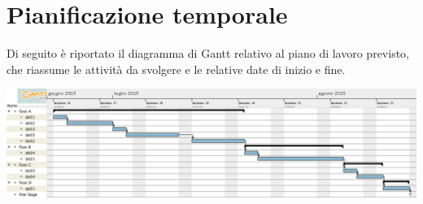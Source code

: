 \section*{Pianificazione temporale}
Di seguito è riportato il diagramma di Gantt relativo al piano di lavoro previsto, che riassume le attività da svolgere e le relative date di inizio e fine.
\begin{center}
	\includegraphics[width=18cm]{img/gantt.png}
\end{center}